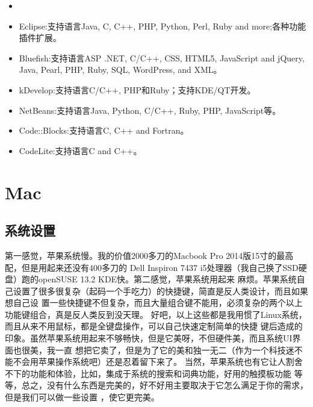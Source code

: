 \documentclass[11pt,fleqn]{book} %
\begin{document}
\begin{recommendation}
  \begin{itemize}
    \item
    \item Eclipse:支持语言Java, C, C++, PHP, Python, Perl, Ruby and more;各种功能插件扩展。
    \item Bluefish:支持语言ASP .NET, C/C++, CSS, HTML5, JavaScript and jQuery, Java, Pearl, PHP, 
      Ruby, SQL, WordPress, and XML。
    \item kDevelop:支持语言C/C++, PHP和Ruby；支持KDE/QT开发。
    \item NetBeans:支持语言Java, Python, C/C++, Ruby, PHP, JavaScript等。
    \item Code::Blocks:支持语言C, C++ and Fortran。
    \item CodeLite:支持语言C and C++。
  \end{itemize}
\end{recommendation}

\chapter{Mac \texorpdfstring{\faApple}{world}}
\section{系统设置}
第一感觉，苹果系统慢。我的价值2000多刀的Macbook Pro 2014版15寸的最高配，但是用起来还没有400多刀的
Dell Inspiron 7437 i5处理器（我自己换了SSD硬盘）跑的openSUSE 13.2 KDE快。第二感觉，苹果系统用起来
麻烦。苹果系统自己设置了很多很复杂（起码一个手吃力）的快捷键，简直是反人类设计，而且如果想自己设
置一些快捷键不但复杂，而且大量组合键不能用，必须复杂的两个以上功能键组合，真是反人类反到没天理。
好吧，以上这些都是我用惯了Linux系统，而且从来不用鼠标，都是全键盘操作，可以自己快速定制简单的快捷
键后造成的印象。虽然苹果系统用起来不够畅快，但是它美呀，不但硬件美，而且系统UI界面也很美，我一直
想把它卖了，但是为了它的美和独一无二（作为一个科技迷不能不会用苹果操作系统吧）还是忍着留下来了。
当然，苹果系统也有它让人割舍不下的功能和体验，比如，集成于系统的搜索和词典功能，好用的触摸板功能
等等，总之，没有什么东西是完美的，好不好用主要取决于它怎么满足于你的需求，但是我们可以做一些设置
，使它更完美。
\end{document}
